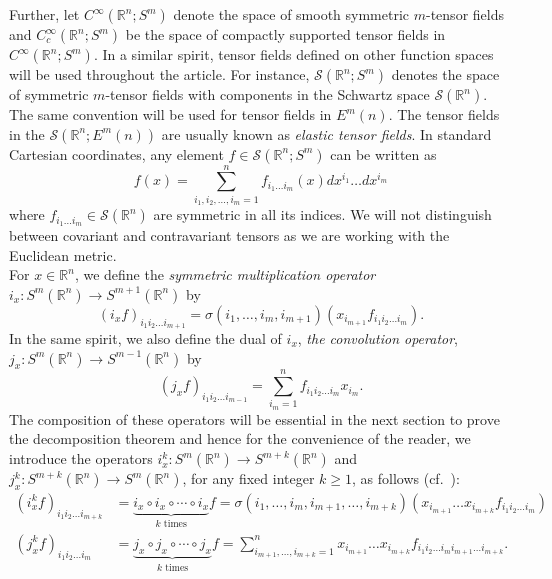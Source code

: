\documentclass[11pt]{article}
\newcommand{\Sc}{\mathcal{S}}
\newcommand{\Rb}{\mathbb{R}}
\newcommand*\Rn{\mathbb{R}^n}
\begin{document}
Further, let  $C^\infty(\mathbb{R}^n;\mathit{S}^{m})$ denote the space of smooth symmetric $m$-tensor fields and $C_c^\infty(\Rb^n;\mathit{S}^{m})$ be the space of compactly supported tensor fields in $C^\infty (\Rb^n;\mathit{S}^{m})$. In a similar spirit, tensor fields defined on other function spaces will be used throughout the article. For instance, $\Sc(\Rb^n;\mathit{S}^{m})$ denotes the space of symmetric $m$-tensor fields with components in the Schwartz space $\mathcal{S}(\Rn)$. The same convention will be used for tensor fields in $E^m(n)$. The tensor fields in the $\mathcal{S}(\Rb^n; E^m(n))$ are usually known as \textit{elastic tensor fields}. In standard Cartesian coordinates, any element $f \in \mathcal{S}(\Rb^n;\mathit{S}^{m})$ can be written as
\[ f(x) = \sum_{i_1, i_2, \dots, i_m = 1}^nf_{i_1\dots i_m}(x) dx^{i_1} \dots dx^{i_m} \]
where  $f_{i_1 \dots i_m} \in \Sc(\Rb^n)$ are symmetric in all its indices. 
We will not distinguish between covariant and contravariant tensors as we are working with the Euclidean metric.  \vspace{2mm}\\
For $x \in \Rb^n$,  we define the \textit{symmetric multiplication operator} $i_x :S^m(\Rb^n)  \rightarrow S^{m+1}(\Rb^n)$ by 
$$(i_x f)_{i_1i_2\dots i_{m+1}} =\sigma(i_1, \dots, i_m, i_{m+1})(x_{i_{m+1}}f_{i_{1}i_{2}\dots i_{m}}).$$
In the same spirit, we also define the dual of $i_x$, \textit{the convolution operator}, $j_x :S^m(\Rb^n)  \rightarrow S^{m-1}(\Rb^n)$ by 
$$(j_x f)_{i_1i_2\dots i_{m-1}} = \sum_{i_m=1}^n f_{i_1i_2\dots i_m}x_{i_m}.$$ 
The composition of these operators will be essential in the next section to prove the decomposition theorem and hence for the convenience of the reader, we introduce the operators $i^k_{x}:  S^m(\Rb^n) \rightarrow S^{m+k}(\Rb^n)$ and $j^k_{x}:  S^{m+k}(\Rb^n) \rightarrow S^{m}(\Rb^n)$, for any fixed integer $k \geq 1$, as follows (cf.~\cite[Page 4]{Rohit_Suman}):
\begin{align*}
\left(i^k_{x}f\right)_{i_1i_2\dots i_{m+k}} &= \underbrace{i_x \circ i_x\circ \cdots\circ i_{x}}_{k \mbox{ times}} f=\sigma(i_1, \dots, i_m, i_{m+1}, \dots, i_{m+k})(x_{i_{m+1}}\dots x_{i_{m+k}}f_{i_{1}i_{2}\dots i_{m}})\\
\left(j^k_{x}f\right)_{i_1i_2\dots i_{m}}&=\underbrace{j_x \circ j_x\circ \cdots\circ j_{x}}_{k \mbox{ times}} f= \sum_{i_{m+1}, \dots,i_{m+k} = 1 }^nx_{i_{m+1}}\dots x_{i_{m+k}}f_{i_{1}i_{2}\dots i_{m}i_{m+1}\dots i_{m+k} }.
\end{align*}
\end{document}

